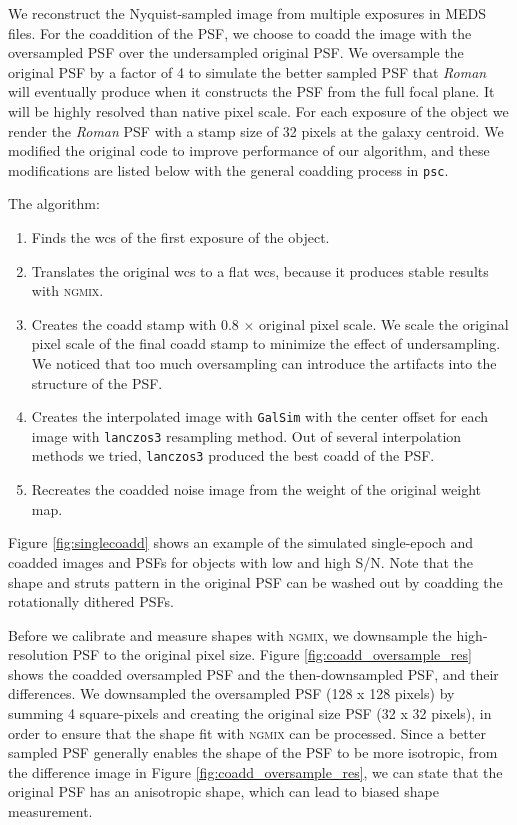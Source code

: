 \documentclass[fleqn,usenatbib]{mnras}
\begin{document}
We reconstruct the Nyquist-sampled image from multiple exposures in MEDS files. For the coaddition of the PSF, we choose to coadd the image with the oversampled PSF over the undersampled original PSF. We oversample the original PSF by a factor of 4 to simulate the better sampled PSF that \emph{Roman} will eventually produce when it constructs the PSF from the full focal plane. It will be highly resolved than native pixel scale. For each exposure of the object we render the \emph{Roman} PSF with a stamp size of 32 pixels at the galaxy centroid. We modified the original code to improve performance of our algorithm, and these modifications are listed below with the general coadding process in \texttt{psc}. 

The algorithm: 
\begin{enumerate}
    \setlength\itemsep{1em}
    \item Finds the wcs of the first exposure of the object.
    \item Translates the original wcs to a flat wcs, because it produces stable results with \textsc{ngmix}.
    \item Creates the coadd stamp with 0.8 $\times$ original pixel scale. We scale the original pixel scale of the final coadd stamp to minimize the effect of undersampling. We noticed that too much oversampling can introduce the artifacts into the structure of the PSF. 
    \item Creates the interpolated image with \texttt{GalSim} with the center offset for each image with \texttt{lanczos3} resampling method. Out of several interpolation methods we tried, \texttt{lanczos3} produced the best coadd of the PSF.
    \item Recreates the coadded noise image from the weight of the original weight map.
\end{enumerate}


Figure \ref{fig:singlecoadd} shows an example of the simulated single-epoch and coadded images and PSFs for objects with low and high S/N. Note that the shape and struts pattern in the original PSF can be washed out by coadding the rotationally dithered PSFs. 


Before we calibrate and measure shapes with \textsc{ngmix}, we downsample the high-resolution PSF to the original pixel size. Figure \ref{fig:coadd_oversample_res} shows the coadded oversampled PSF and the then-downsampled PSF, and their differences. We downsampled the oversampled PSF (128 x 128 pixels) by summing 4 square-pixels and creating the original size PSF (32 x 32 pixels), in order to ensure that the shape fit with \textsc{ngmix} can be processed. Since a better sampled PSF generally enables the shape of the PSF to be more isotropic, from the difference image in Figure \ref{fig:coadd_oversample_res}, we can state that the original PSF has an anisotropic shape, which can lead to biased shape measurement. 
\end{document}
